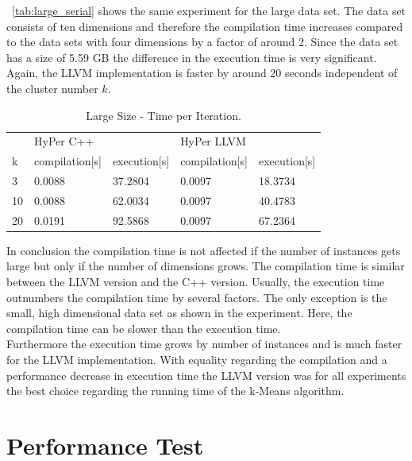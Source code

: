~\autoref{tab:large_serial} shows the same experiment for the large data set. The data set consists of ten dimensions and therefore the compilation time increases compared to the data sets with four dimensions by a factor of around 2. Since the data set has a size of 5.59 GB the difference in the execution time is very significant. Again, the LLVM implementation is faster by around 20 seconds independent of the cluster number $k$.



\begin{table}[htsb]
  \caption[Large Size - Time per Iteration]{Large Size - Time per Iteration.}
  \label{tab:large_serial}
  \centering
  \begin{tabular}{l l l l l}
    \toprule
      & HyPer C++ & & HyPer LLVM & \\
      k & compilation[s] & execution[s] & compilation[s] & execution[s] \\
    \midrule
      3  & 0.0088 & 37.2804 & 0.0097 & 18.3734 \\
      10 & 0.0088 & 62.0034 & 0.0097 & 40.4783 \\
      20 & 0.0191 & 92.5868 & 0.0097 & 67.2364 \\
    \bottomrule
  \end{tabular}
\end{table}


In conclusion the compilation time is not affected if the number of instances gets large but only if the number of dimensions grows. The compilation time is similar between the LLVM version and the C++ version. Usually, the execution time outnumbers the compilation time by several factors. The only exception is the small, high dimensional data set as shown in the experiment. Here, the compilation time can be slower than the execution time.
\\
Furthermore the execution time grows by number of instances and is much faster for the LLVM implementation. With equality regarding the compilation and a performance decrease in execution time the LLVM version was for all experiments the best choice regarding the running time of the k-Means algorithm.


\section{Performance Test}\label{section:performance}

